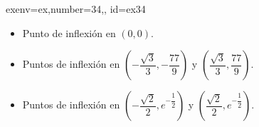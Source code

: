 \begin{SolutionCollapsible}{exenv=ex,number=34,, id=ex34}

		\begin{itemize}
			\item Punto de inflexión en $(0,0)$.
			\item Puntos de inflexión en $(-\dfrac{\sqrt{3}}{3},-\dfrac{77}{9})$ y $(\dfrac{\sqrt{3}}{3},\dfrac{77}{9})$.
			\item Puntos de inflexión en $(-\dfrac{\sqrt{2}}{2},e^{-\dfrac{1}{2}})$ y $(\dfrac{\sqrt{2}}{2},e^{-\dfrac{1}{2}})$.
		\end{itemize}
	
\end{SolutionCollapsible}
